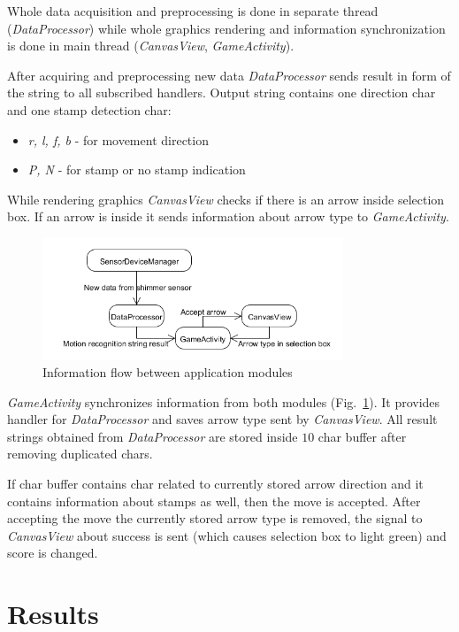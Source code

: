 \documentclass[conference]{IEEEtran}
\begin{document}
Whole data acquisition and preprocessing is done in separate thread (\emph{DataProcessor}) while whole graphics rendering and information synchronization is done in main thread (\emph{CanvasView}, \emph{GameActivity}).

After acquiring and preprocessing new data \emph{DataProcessor} sends result in form of the string to all subscribed handlers. Output string contains one direction char and one stamp detection char:
\begin{itemize}
    \item \emph{r, l, f, b} - for movement direction
    \item \emph{P, N} - for stamp or no stamp indication
\end{itemize}

While rendering graphics \emph{CanvasView} checks if there is an arrow inside selection box.
If an arrow is inside it sends information about arrow type to \emph{GameActivity}.

\begin{figure}[!h]
    \centering
    \includegraphics[width=9cm]{Images/Synchronization.png}
    \caption{Information flow between application modules}
    \label{fig:Synchronization}
\end{figure}

\emph{GameActivity} synchronizes information from both modules (Fig.~\ref{fig:Synchronization}).
It provides handler for \emph{DataProcessor} and saves arrow type sent by \emph{CanvasView}.
All result strings obtained from \emph{DataProcessor} are stored inside $10$ char buffer after removing duplicated chars.

If char buffer contains char related to currently stored arrow direction and it contains information about stamps as well, then the move is accepted. After accepting the move the currently stored arrow type is removed, the signal to \emph{CanvasView} about success is sent (which causes selection box to light green) and score is changed.

\section{Results}
\end{document}
